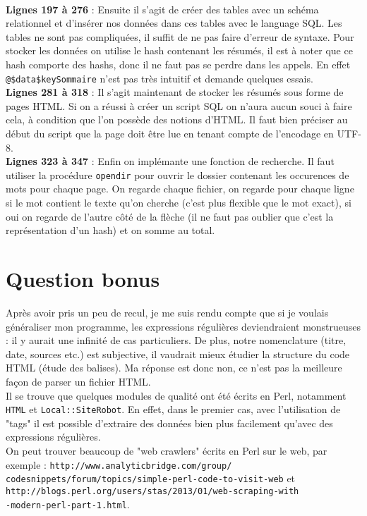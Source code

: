 \documentclass[11pt]{article}
\begin{document}
\bigskip
\\\textbf{Lignes 197 à 276} : Ensuite il s'agit de créer des tables avec un schéma relationnel et d'insérer nos données dans ces tables avec le language SQL. Les tables ne sont pas compliquées, il suffit de ne pas faire d'erreur de syntaxe. Pour stocker les données on utilise le hash contenant les résumés, il est à noter que ce hash comporte des hashs, donc il ne faut pas se perdre dans les appels. En effet \texttt{@{\$data{\$key}{Sommaire}}} n'est pas très intuitif et demande quelques essais.
\bigskip
\\\textbf{Lignes 281 à 318} : Il s'agit maintenant de stocker les résumés sous forme de pages HTML. Si on a réussi à créer un script SQL on n'aura aucun souci à faire cela, à condition que l'on possède des notions d'HTML. Il faut bien préciser au début du script que la page doit être lue en tenant compte de l'encodage en UTF-8.
\bigskip
\\\textbf{Lignes 323 à 347} : Enfin on implémante une fonction de recherche. Il faut utiliser la procédure \texttt{opendir} pour ouvrir le dossier contenant les occurences de mots pour chaque page. On regarde chaque fichier, on regarde pour chaque ligne si le mot contient le texte qu'on cherche (c'est plus flexible que le mot exact), si oui on regarde de l'autre côté de la flèche (il ne faut pas oublier que c'est la représentation d'un hash) et on somme au total.

\section{Question bonus}
Après avoir pris un peu de recul, je me suis rendu compte que si je voulais généraliser mon programme, les expressions régulières deviendraient monstrueuses : il y aurait une infinité de cas particuliers. De plus, notre nomenclature (titre, date, sources etc.) est subjective, il vaudrait mieux étudier la structure du code HTML (étude des balises). Ma réponse est donc non, ce n'est pas la meilleure façon de parser un fichier HTML.
\\Il se trouve que quelques modules de qualité ont été écrits en Perl, notamment \texttt{HTML} et \texttt{Local::SiteRobot}. En effet, dans le premier cas, avec l'utilisation de "tags" il est possible d'extraire des données bien plus facilement qu'avec des expressions régulières.
\\On peut trouver beaucoup de "web crawlers" écrits en Perl sur le web, par exemple : \texttt{http://www.analyticbridge.com/group/\\codesnippets/forum/topics/simple-perl-code-to-visit-web} et \\\texttt{http://blogs.perl.org/users/stas/2013/01/web-scraping-with\\-modern-perl-part-1.html}.
\end{document}
